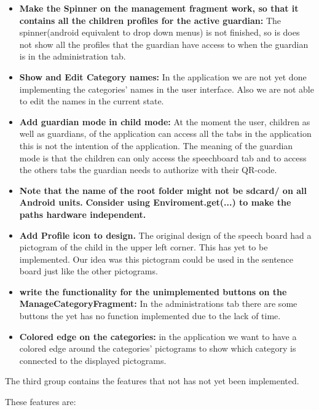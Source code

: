 \begin{itemize}
	\item \textbf{Make the Spinner on the management fragment work, so that it contains all the children profiles for the active 									guardian:} The spinner(android equivalent to drop down menus) is not finished, so is does not show all the profiles that the 						guardian have access to when the guardian is in the administration tab.  
	\item \textbf{Show and Edit Category names:} In the application we are not yet done implementing the categories' names in the user 						interface. Also we are not able to edit the names in the current state. 
	 
	\item \textbf{Add guardian mode in child mode:} At the moment the user, children as well as guardians, of the application can access 					all the tabs in the application this is not the intention of the application. The meaning of the guardian mode is that the 							children can only access the speechboard tab and to access the others tabs the guardian needs to authorize with their QR-code.  
	
	\item \textbf{Note that the name of the root folder might not be sdcard/ on all Android units.}
		\subitem \textbf{Consider using Enviroment.get(...) to make the paths hardware independent.}
	\item \textbf{Add Profile icon to design.} The original design of the speech board had a pictogram of the child in the upper left 						corner. This has yet to be implemented. Our idea was this pictogram could be used in the sentence board just like the other 						pictograms.
	\item \textbf{write the functionality for the unimplemented buttons on the ManageCategoryFragment:} In the administrations tab there 					are some buttons the yet has no function implemented due to the lack of time.
	 
	\item \textbf{Colored edge on the categories:} in the application we want to have a colored edge around the categories' pictograms to 					show which category is connected to the displayed pictograms.
\end{itemize}


The third group contains the features that not has not yet been implemented.

These features are: 

